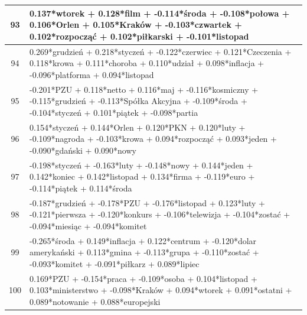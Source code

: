 \documentclass[11pt,a4paper]{article}
\begin{document}
\begin{table}[h]
\begin{tabular}{|c|>{\footnotesize}p{\linewidth}|}
93 & 0.137*wtorek + 0.128*film + -0.114*środa + -0.108*połowa + 0.106*Orlen + 0.105*Kraków + -0.103*czwartek + 0.102*rozpocząć + 0.102*piłkarski + -0.101*listopad\\\hline
94 & 0.269*grudzień + 0.218*styczeń + -0.122*czerwiec + 0.121*Czeczenia + 0.118*krowa + 0.111*choroba + 0.110*udział + 0.098*inflacja + -0.096*platforma + 0.094*listopad\\\hline
95 & -0.201*PZU + 0.118*netto + 0.116*maj + -0.116*kosmiczny + -0.115*grudzień + -0.113*Spółka Akcyjna + -0.109*środa + -0.104*styczeń + 0.101*piątek + -0.098*partia\\\hline
96 & 0.154*styczeń + 0.144*Orlen + 0.120*PKN + 0.120*luty + -0.109*nagroda + -0.103*krowa + 0.094*rozpocząć + 0.093*jeden + -0.090*gdański + 0.090*nowy\\\hline
97 & -0.198*styczeń + -0.163*luty + -0.148*nowy + 0.144*jeden + 0.142*koniec + 0.142*listopad + 0.134*firma + -0.119*euro + -0.114*piątek + 0.114*środa\\\hline
98 & -0.187*grudzień + -0.178*PZU + -0.176*listopad + 0.123*luty + -0.121*pierwsza + -0.120*konkurs + -0.106*telewizja + -0.104*zostać + -0.094*miesiąc + -0.094*komitet\\\hline
99 & -0.265*środa + 0.149*inflacja + 0.122*centrum + -0.120*dolar amerykański + 0.113*gmina + -0.113*grupa + -0.110*zostać + -0.093*komitet + -0.091*piłkarz + 0.089*lipiec\\\hline
100 & 0.169*PZU + -0.154*praca + -0.109*osoba + 0.104*listopad + 0.103*ministerstwo + -0.098*Kraków + 0.094*wtorek + 0.091*ostatni + 0.089*notowanie + 0.088*europejski\\\hline
\end{tabular}
\end{table}
\end{document}
